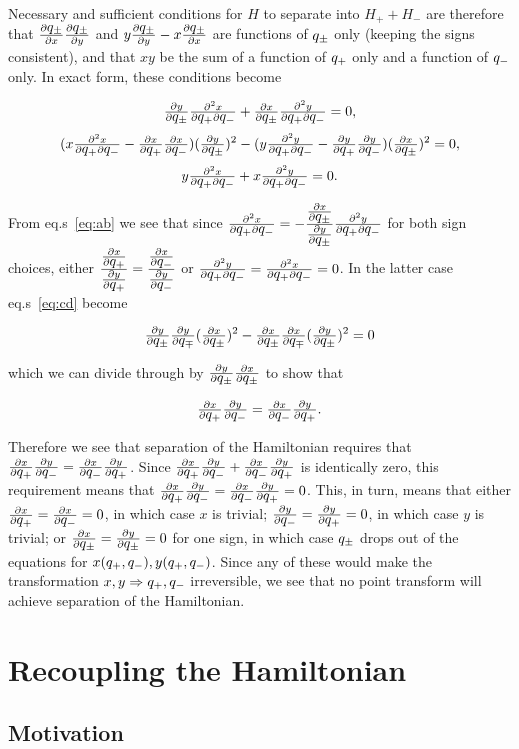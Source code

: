 Necessary and sufficient conditions for $H$ to separate into $H_{+} + H_{-}$
are therefore that $\uvx \uvy$ and $y \uvy - x \uvx$ are functions of
$\uv$ only (keeping the signs consistent), and that $xy$ be the sum of a 
function of $\qp$ only and a function of $\qm$ only.  In exact form, these
conditions become

\begin{equation}
\yuv \ddx + \xuv \ddy = 0, \label{eq:ab}
\end{equation}
\begin{equation}
(x \ddx - \xu \xv) (\yuv)^2 - (y \ddy - \yu \yv) (\xuv)^2 = 0,\label{eq:cd}
\end{equation}
\begin{equation}
y \ddx + x \ddy = 0.
\end{equation}

From eq.s~\ref{eq:ab} we see that since 
$\ddx = - \frac{\xuv}{\yuv} \ddy$ for both sign choices, either 
$\frac{\xu}{\yu} = \frac{\xv}{\yv}$ or $\ddy = \ddx = 0$.  In the latter
case eq.s~\ref{eq:cd} become

\begin{equation}
\yuv \yvu (\xuv)^2 - \xuv \xvu (\yuv)^2 = 0
\end{equation}

which we can divide through by $\yuv \xuv$ to show that

\begin{equation}
\xu \yv = \xv \yu.
\end{equation}

Therefore we see that separation of the Hamiltonian requires that
$\xu \yv = \xv \yu$.  Since $\xu \yv + \xv \yu$ is identically zero,
this requirement means that $\xu \yv = \xv \yu = 0$.  This, in turn, means 
that either
$\xu = \xv = 0$, in which case $x$ is trivial; $\yv = \yu = 0$, in which
case $y$ is trivial; or $\xuv = \yuv = 0$ for one sign, in which case 
$\uv$ drops out of the equations for $x(\qp, \qm), y(\qp, \qm)$.  
Since any of these would make the transformation $x, y
\Rightarrow \qp, \qm$
irreversible, we see that no point transform will achieve separation of the
Hamiltonian.

\section{Recoupling the Hamiltonian}

\subsection{Motivation}

